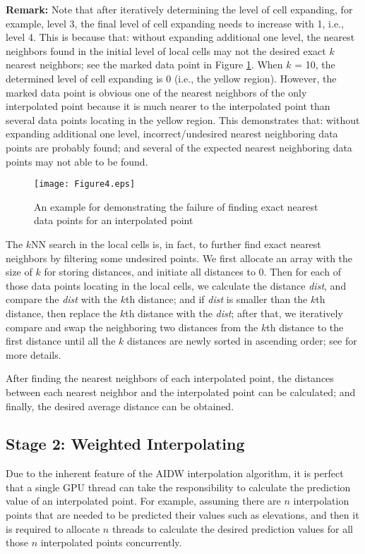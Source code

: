 \documentclass[final,5p,times,twocolumn,authoryear]{elsarticle}
\begin{document}
			\textbf{Remark:} Note that after iteratively determining the level of cell 
			expanding, for example, level 3, the final level of cell expanding needs to 
			increase with 1, i.e., level 4. This is because that: without expanding 
			additional one level, the nearest neighbors found in the initial level of 
			local cells may not the desired exact $k$ nearest neighbors; see the marked 
			data point in Figure \ref{fig4}. When $k$ = 10, the determined level of cell expanding 
			is 0 (i.e., the yellow region). However, the marked data point is obvious 
			one of the nearest neighbors of the only interpolated point because it is 
			much nearer to the interpolated point than several data points locating in 
			the yellow region. This demonstrates that: without expanding additional one 
			level, incorrect/undesired nearest neighboring data points are probably 
			found; and several of the expected nearest neighboring data points may not able to be found.
			
			\begin{figure}[ht]
				\centering
				\texttt{[image: Figure4.eps]}
				\caption{An example for demonstrating the failure of finding exact 
								nearest data points for an interpolated point}
				\label{fig4}
			\end{figure}
			
			The $k$NN search in the local cells is, in fact, to further find exact nearest 
			neighbors by filtering some undesired points. We first allocate an array 
			with the size of $k$ for storing distances, and initiate all distances to 0. 
			Then for each of those data points locating in the local cells, we calculate 
			the distance \textit{dist}, and compare the \textit{dist} with the $k$th distance; and if \textit{dist} is smaller 
			than the $k$th distance, then replace the $k$th distance with the \textit{dist}; after that, we 
			iteratively compare and swap the neighboring two distances from the $k$th 
			distance to the first distance until all the $k$ distances are newly sorted in 
			ascending order; see \cite{29DBLP:journals/corr/MeiXX15} for more details.
			
			After finding the nearest neighbors of each interpolated point, the 
			distances between each nearest neighbor and the interpolated point can be 
			calculated; and finally, the desired average distance can be obtained. 
			
			\subsection{Stage 2: Weighted Interpolating}
			Due to the inherent feature of the AIDW interpolation algorithm, it is 
			perfect that a single GPU thread can take the responsibility to calculate 
			the prediction value of an interpolated point. For example, assuming there 
			are $n$ interpolation points that are needed to be predicted their values such 
			as elevations, and then it is required to allocate $n$ threads to calculate the 
			desired prediction values for all those $n$ interpolated points concurrently. 
			
\end{document}
